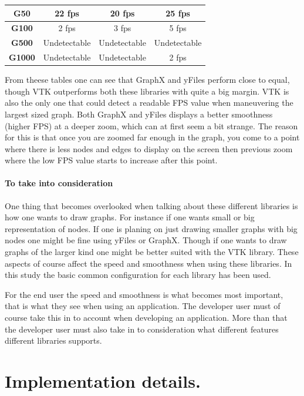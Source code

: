 \documentclass[a4paper,11pt]{kth-mag}
\begin{document}
\begin{appendices}
\begin{table}[h]
\begin{tabular}{|c|c|c|c|}
\textbf{G50}   & 22 fps       & 20 fps       & 25 fps       \\ \hline
\textbf{G100}  & 2 fps        & 3 fps        & 5 fps        \\ \hline
\textbf{G500}  & Undetectable & Undetectable & Undetectable \\ \hline
\textbf{G1000} & Undetectable & Undetectable & 2 fps        \\ \hline
\end{tabular}
\label{table-yFiles:appendix}
\end{table}
\newpage
From theese tables one can see that GraphX and yFiles perform close to equal, though VTK outperforms both these libraries with quite a big margin. VTK is also the only one that could detect a readable 
FPS value when maneuvering the largest sized graph. Both GraphX and yFiles displays a better smoothness (higher FPS) at a deeper zoom, which can at first seem a bit strange. 
The reason for this is that once you are zoomed far enough in the graph, you come to a point where there is less nodes and edges to display on the screen then previous zoom
where the low FPS value starts to increase after this point. 

\subsubsection{To take into consideration}
One thing that becomes overlooked when talking about these different libraries is how one wants to draw graphs. For instance if one wants small or big representation of nodes. If one is planing on just drawing 
smaller graphs with big nodes one might be fine using yFiles or GraphX. Though if one wants to draw graphs of the larger kind one might be better suited with the VTK library. These aspects of course affect 
the speed and smoothness when using these libraries. In this study the basic common configuration for each library has been used.

For the end user the speed and smoothness is what becomes most important, that is what they see when using an application. The developer user must of course take this in to account when developing an application.
 More than that the developer user must also take in to consideration what different features different libraries supports.
 
\chapter{Implementation details.}
\label{appendix:implementation:details}


\end{appendices}
\end{document}
